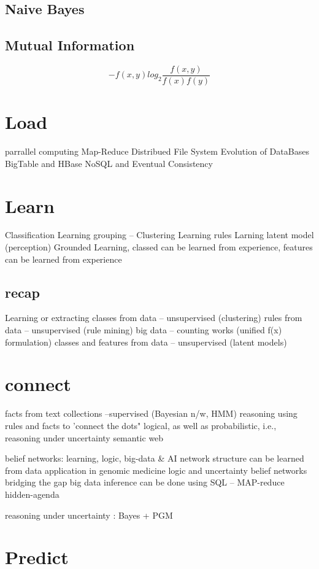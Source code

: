 \documentclass[11pt, oneside]{article}   	%
\begin{document}
\subsection{Naive Bayes}

\subsection{Mutual Information}
	\begin{equation}
	-f(x,y)log_2 \frac{f(x,y)}{f(x) f(y)}
	\end{equation}


\section{Load}
	parrallel computing
	Map-Reduce
	Distribued File System
	Evolution of DataBases
	BigTable and HBase
	NoSQL and Eventual Consistency


\section{Learn}

	Classification
	Learning grouping -- Clustering
	Learning rules
	Larning latent model  (perception)
	Grounded Learning,  classed can be learned from experience, features can be learned from experience
\subsection{recap}

	Learning or extracting
	classes from data -- unsupervised (clustering)
	rules from data  -- unsupervised (rule mining)
	big data -- counting works (unified f(x) formulation)
	classes and features from data -- unsupervised (latent models)

\section{connect }
 facts from text collections --supervised (Bayesian n/w, HMM)
	reasoning using rules and facts to 'connect the dots"
	logical, as well as probabilistic, i.e., reasoning under uncertainty semantic web

belief networks: learning, logic, big-data \& AI
	network structure can be learned from data
	application in genomic medicine
	logic and uncertainty
		belief networks bridging the gap
	big data
		inference can be done using SQL -- MAP-reduce
	hidden-agenda

	reasoning under uncertainty :  Bayes + PGM

\section{Predict}
\end{document}
